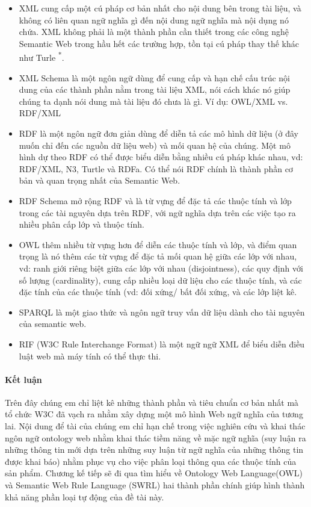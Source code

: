 \begin{itemize}
\item XML cung cấp một cú pháp cơ bản nhất cho nội dung bên trong tài liệu, và không có liên quan ngữ nghĩa gì đến nội dung ngữ nghĩa mà nội dụng nó chứa. XML không phải là một thành phần cần thiết trong các công nghệ Semantic Web trong hầu hết các trường hợp, tồn tại cú pháp thay thế khác như Turle \textsuperscript{*}. 
\item XML Schema là một ngôn ngữ dùng để cung cấp và hạn chế cấu trúc nội dung của các thành phần nằm trong tài liệu XML, nói cách khác nó giúp chúng ta dạnh nói dung mà tài liệu đó chưa là gì. Ví dụ: OWL/XML vs. RDF/XML
\item RDF \cite{rdf} là một ngôn ngữ đơn giản dùng để diễn tả các mô hình dữ liệu (ở đây muốn chỉ đến các nguồn dữ liệu web) và mối quan hệ của chúng. Một mô hình dự theo RDF có thể được biểu diễn bằng nhiều cú pháp khác nhau, vd: RDF/XML, N3, Turtle và RDFa. Có thể nói RDF chính là thành phần cơ bản và quan trọng nhất của Semantic Web.
\item RDF Schema \cite{rdfs} mở rộng RDF và là từ vựng để đặc tả các thuộc tính và lớp trong các tài nguyên dựa trên RDF, với ngữ nghĩa dựa trên các việc tạo ra nhiều phân cấp lớp và thuộc tính.
\item OWL thêm nhiều từ vựng hơn để diễn các thuộc  tính và lớp, và điểm quan trọng là nó thêm các từ vựng để đặc tả mối quan hệ giữa các lớp với nhau, vd: ranh giới riêng biệt giữa các lớp với nhau (disjointness), các quy định với số lượng (cardinality), cung cấp nhiều loại dữ liệu cho các thuộc tính, và các đặc tính của các thuộc tính (vd: đối xứng/ bất đối xứng, và các lớp liệt kê.
\item SPARQL là một giao thức và ngôn ngữ truy vấn dữ liệu dành cho tài nguyên của semantic web.
\item RIF (W3C Rule Interchange Format) là một ngữ ngữ XML để biểu diễn điều luật web mà máy tính có thể thực thi.
\end{itemize}
{\let\thefootnote\relax{}
}
\paragraph{Kết luận} Trên đây chúng em chỉ liệt kê những thành phần và tiêu chuẩn cơ bản nhất mà tổ chức W3C đã vạch ra nhằm xây dựng một mô hình Web ngữ nghĩa của tương lai. Nội dung để tài của chúng em chỉ hạn chế trong việc nghiên cứu và khai thác ngôn ngữ ontology web nhằm khai thác tiềm năng về mặc ngữ nghĩa (suy luận ra những thông tin mới dựa trên những suy luận từ ngữ nghĩa của những thông tin được khai báo) nhằm phục vụ cho việc phân loại thông qua các thuộc tính của sản phẩm. Chương kế tiếp sẽ đi qua tìm hiểu về Ontology Web Language(OWL) và Semantic Web Rule Language (SWRL) hai thành phần chính giúp hình thành khả năng phần loại tự động của đề tài này.




